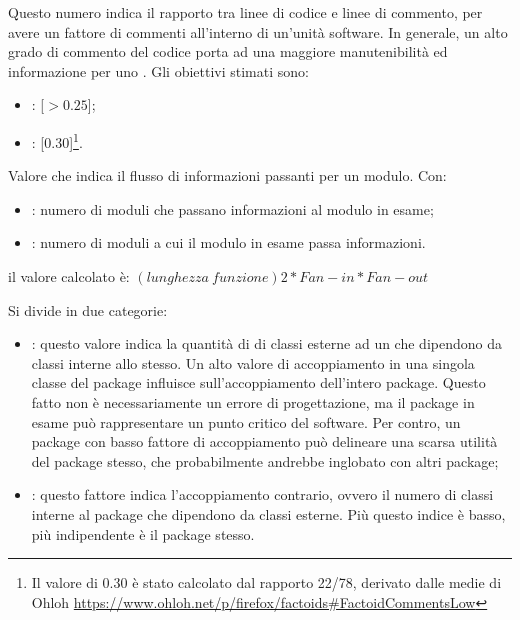 \label{4.2.5}
Questo numero indica il rapporto tra linee di codice e linee di commento, per avere un fattore di commenti all'interno di un'unità software. In generale, un alto grado di commento del codice porta ad una maggiore manutenibilità ed informazione per uno .
Gli obiettivi stimati sono:
\begin{itemize}
\item {}: [$>0.25$];
\item {}: [0.30]\footnote{Il valore di 0.30 è stato calcolato dal rapporto 22/78, derivato dalle medie di Ohloh \url{https://www.ohloh.net/p/firefox/factoids\#FactoidCommentsLow}}.
\end{itemize}

\label{4.2.6}
Valore che indica il flusso di informazioni passanti per un modulo.
Con:
\begin{itemize}
\item {}: numero di moduli che passano informazioni al modulo in esame;
\item {}: numero di moduli a cui il modulo in esame passa informazioni.
\end{itemize}
il valore calcolato è:
\begin{math}(lunghezza\:funzione)2 * Fan-in * Fan-out\end{math}

\label{4.2.7}
Si divide in due categorie:
\begin{itemize}
\item {}: questo valore indica la quantità di di classi esterne ad un  che dipendono da classi interne allo stesso.
Un alto valore di accoppiamento in una singola classe del package influisce sull'accoppiamento dell'intero package. Questo fatto non è necessariamente un errore di progettazione, ma il package in esame può rappresentare un punto critico del software. Per contro, un package con basso fattore di accoppiamento può delineare una scarsa utilità del package stesso, che probabilmente andrebbe inglobato con altri package;
\item {}: questo fattore indica l'accoppiamento contrario, ovvero il numero di classi interne al package che dipendono da classi esterne. Più questo indice è basso, più indipendente è il package stesso.
\end{itemize}

